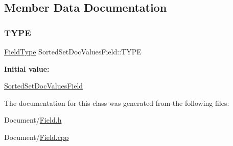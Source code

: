 \subsection{Member Data Documentation}
\mbox{\label{classlucene_1_1core_1_1document_1_1SortedSetDocValuesField_a93e0580ec4096f4c19090699aab8d5e9}} 
\subsubsection{\texorpdfstring{T\+Y\+PE}{TYPE}}
{\footnotesize\ttfamily \mbox{\hyperlink{classlucene_1_1core_1_1document_1_1FieldType}{Field\+Type}} Sorted\+Set\+Doc\+Values\+Field\+::\+T\+Y\+PE\hspace{0.3cm}{\ttfamily [static]}}

{\bfseries Initial value\+:}
\begin{DoxyCode}
\DoxyCodeLine{= []() \{}
\DoxyCodeLine{\}()}
\end{DoxyCode}
\mbox{\hyperlink{classlucene_1_1core_1_1document_1_1SortedSetDocValuesField}{Sorted\+Set\+Doc\+Values\+Field}} 

The documentation for this class was generated from the following files\+:\begin{DoxyCompactItemize}
\item 
Document/\mbox{\hyperlink{Document_2Field_8h}{Field.\+h}}\item 
Document/\mbox{\hyperlink{Field_8cpp}{Field.\+cpp}}\end{DoxyCompactItemize}
